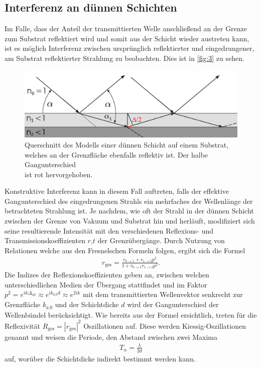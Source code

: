 \documentclass[12pt]{article}
\begin{document}
\subsection{Interferenz an dünnen Schichten}
Im Falle, dass der Anteil der transmittierten Welle anschließend an der Grenze zum Substrat reflektiert wird und somit aus der Schicht wieder austreten kann, ist es möglich Interferenz zwischen ursprünglich reflektierter und eingedrungener, am Substrat reflektierter Strahlung zu beobachten. Dies ist in \autoref{fig:3} zu sehen.
\begin{figure}[H]
  \centering
  \includegraphics[scale=0.3]{Ressourcen/schicht.png}
  \caption{Querschnitt des Modells einer dünnen Schicht auf einem Substrat,\\ welches an der Grenzfläche ebenfalls reflektiv ist. Der halbe Gangunterschied \\ ist rot hervorgehoben.}\label{fig:3}
\end{figure}
Konstruktive Interferenz kann in diesem Fall auftreten, falls der effektive Gangunterschied des eingedrungenen Strahls ein mehrfaches der Wellenlänge der betrachteten Strahlung ist.
Je nachdem, wie oft der Strahl in der dünnen Schicht zwischen der Grenze von Vakuum und Substrat hin und herläuft, modifiziert sich seine resultierende Intensität mit den verschiedenen Reflexions- und Transmissionskoeffizienten $r$,$t$ der Grenzübergänge.
Durch Nutzung von Relationen welche aus den Fresnelschen Formeln folgen, ergibt sich die Formel
\begin{align}
  r_\text{ges}= \frac{r_{0\to1}+r_{1\to2}p^2}{1+r_{0\to1}r_{1\to2}p^2}\text{.}\label{eqn:schicht}
\end{align}
Die Indizes der Reflexionskoeffizienten geben an, zwischen welchen unterschiedlichen Medien der Übergang stattfindet und im Faktor $p^2=e^{ik\Delta_\text{eff}}\approx e^{ik_\text{z,0}d} \approx e^{2ik}$ mit dem transmittierten Wellenvektor senkrecht zur Grenzfläche $k_\text{z,0}$ und der Schichtdicke $d$ wird der Gangunterschied der Wellenbündel berücksichtigt.
Wie bereits aus der Formel ersichtlich, treten für die Reflexivität $R_\text{ges}=|r_\text{ges}|^2$ Oszillationen auf.
Diese werden Kiessig-Oszillationen genannt und weisen die Periode, den Abstand zwischen zwei Maxima 
\begin{align}
  T_\alpha = \frac{\lambda}{2d}
\end{align}
auf, worüber die Schichtdicke indirekt bestimmt werden kann\cite{kiessig}.
\end{document}
